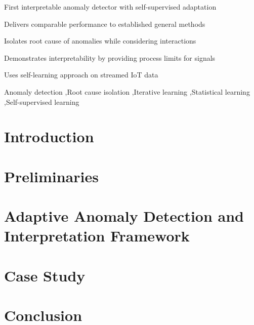 \documentclass[preprint,12pt,authoryear]{elsarticle}
\begin{document}
\begin{frontmatter}
\begin{highlights}
\item First interpretable anomaly detector with self-supervised adaptation
\item Delivers comparable performance to established general methods
\item Isolates root cause of anomalies while considering interactions
\item Demonstrates interpretability by providing process limits for signals
\item Uses self-learning approach on streamed IoT data
\end{highlights}

\begin{keyword}
Anomaly detection \sep Root cause isolation \sep Iterative learning \sep Statistical learning \sep Self-supervised learning
\end{keyword}

\end{frontmatter}

\linenumbers

\section{Introduction}
\label{Introduction}


\section{Preliminaries}
\label{Preliminaries}


\section{Adaptive Anomaly Detection and Interpretation Framework}
\label{Proposed Method}


\section{Case Study}
\label{Case Study}


\section{Conclusion}
\label{Conclusion}

\end{document}

